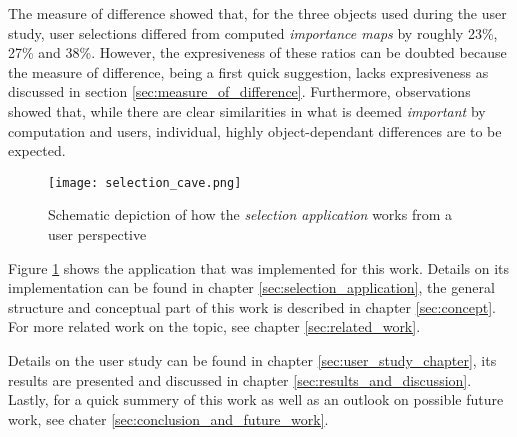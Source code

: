 The measure of difference showed that, for the three objects used during the user study, user selections differed from computed \textit{importance maps} by roughly 23\%, 27\% and 38\%. However, the expresiveness of these ratios can be doubted because the measure of difference, being a first quick suggestion, lacks expresiveness as discussed in section \ref{sec:measure_of_difference}. Furthermore, observations showed that, while there are clear similarities in what is deemed \textit{important} by computation and users, individual, highly object-dependant differences are to be expected.

\begin{figure}[htb]
  \centering
  \texttt{[image: selection\_cave.png]}
  \caption{Schematic depiction of how the \textit{selection application} works from a user perspective}
  \label{fig:intro_pic}
\end{figure}

Figure \ref{fig:intro_pic} shows the application that was implemented for this work. Details on its implementation can be found in chapter \ref{sec:selection_application}, the general structure and conceptual part of this work is described in chapter \ref{sec:concept}. For more related work on the topic, see chapter \ref{sec:related_work}.

Details on the user study can be found in chapter \ref{sec:user_study_chapter}, its results are presented and discussed in chapter \ref{sec:results_and_discussion}. Lastly, for a quick summery of this work as well as an outlook on possible future work, see chater \ref{sec:conclusion_and_future_work}.

